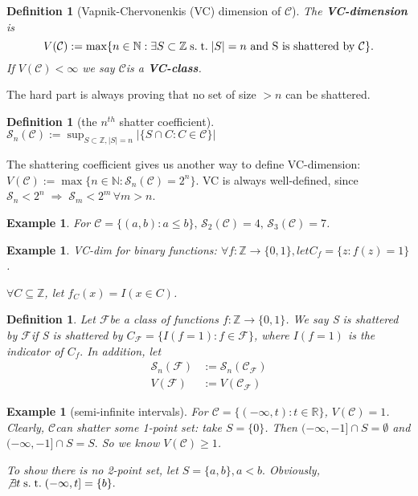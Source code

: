 \documentclass[10pt]{article}
\newtheorem{definition}[def]{Definition}
\newtheorem{example}[ex]{Example}
\newcommand{\F}{\mathcal{F}}
\newcommand{\R}{\mathbb{R}}
\renewcommand{\S}{\mathcal{S}}
\newcommand{\Z}{\mathbb{Z}}
\newcommand{\N}{\mathbb{N}}
\renewcommand{\F}{\ensuremath{\mathcal{F}}}
\newcommand{\C}{\ensuremath{\mathcal{C}}}
\newcommand{\st}{\ensuremath{\;\mathrm{s.}\;\mathrm{t.}\;}}
\newcommand{\then}{\ensuremath{\;\Rightarrow\;}}
\begin{document}
\begin{definition}[Vapnik-Chervonenkis (VC) dimension of \C]
  The \textbf{VC-dimension} is 
  \[
  V(\C) := \max\{n\in\N:\exists S\subset\Z\st |S|=n \text{ and S is shattered by \C}\}.
  \]
  If $V(\C)<\infty$ we say \C is a \textbf{VC-class}.
 \end{definition}

The hard part is always proving that no set of size $> n$ can be shattered.

\begin{definition}[the $n^{th}$ shatter coefficient]
$\mathcal{S}_n(\C):=\sup_{S\subset\Z,|S|=n}|\{S\cap C:C\in\C\}|$
\end{definition}
The shattering coefficient gives us another way to define VC-dimension: $V(\C) := \max\{n\in\N:\S_n(\C)=2^n\}$.
VC is always well-defined, since $\S_n<2^n \then \S_m<2^m\,\forall m>n$.

\begin{example}
  For $\C=\{(a,b):a\leq b\},\,\S_2(\C)=4,\,\S_3(\C)=7$.
\end{example}    

\begin{example}
  VC-dim for binary functions:
  $\forall f:\Z\to\{0,1\},  let C_f=\{z:f(z)=1\}$.
  
$\forall C\subseteq\Z$, let $f_C(x)=I(x\in C)$.
\end{example}

\begin{definition}
Let \F be a class of functions $f:\Z\to\{0,1\}$.  We say S is shattered by \F if S is shattered by $C_\F = \{I(f=1):f\in\F\}$,
where $I(f=1)$ is the indicator of $C_f.$  In addition, let
\begin{align}
\S_n(\F) &:=\S_n(\C_\F)\\
V(\F)&:=V(\C_\F)
\end{align}
\end{definition}

\begin{example}[semi-infinite intervals]
For $\C = \{(-\infty,t):t\in\R\}$, $V(\C) = 1$. Clearly, \C can shatter some 1-point set: take $S=\{0\}$.  Then $(-\infty,-1]\cap S = \emptyset$ and $ (-\infty,-1]\cap S = S.$
    So we know $V(\C)\geq 1$.
    
To show there is no 2-point set,
let $S=\{a,b\}, a<b.$
Obviously, $\not\exists t\st(-\infty,t]=\{b\}.$
\end{example}
\end{document}
